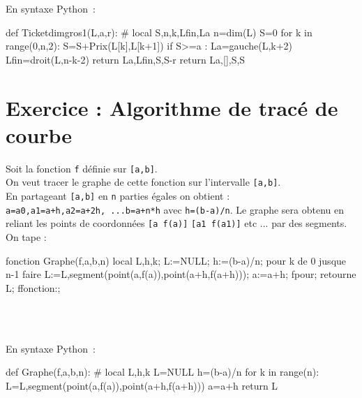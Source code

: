 \documentclass[12pt,a4paper]{book}
\begin{document}
\begin{giacjshere}
En syntaxe Python~:
\begin{giacprog}
def Ticketdimgros1(L,a,r):
    # local S,n,k,Lfin,La
    n=dim(L)
    S=0
    for k in range(0,n,2):
        S=S+Prix(L[k],L[k+1])
        if S>=a :
            La=gauche(L,k+2)
            Lfin=droit(L,n-k-2)
            return La,Lfin,S,S-r
    return La,[],S,S
\end{giacprog}

\section{Exercice : Algorithme de trac\'e de courbe}
Soit la fonction {\tt f} d\'efinie sur {\tt [a,b]}.\\
 On veut tracer le graphe de cette fonction sur l'intervalle {\tt [a,b]}.\\
 En partageant {\tt [a,b]} en {\tt n} parties \'egales on obtient : \\
{\tt a=a0,a1=a+h,a2=a+2h, ...b=a+n*h} avec {\tt h=(b-a)/n}.
Le graphe sera obtenu en reliant les points de coordonn\'ees {\tt [a f(a)]}
{\tt [a1 f(a1)]} etc ... par des segments.\\
On tape :
\begin{giaconload}
fonction Graphe(f,a,b,n)
 local L,h,k;
 L:=NULL;
 h:=(b-a)/n;
 pour k de 0 jusque n-1 faire
   L:=L,segment(point(a,f(a)),point(a+h,f(a+h)));
   a:=a+h;
 fpour;
 retourne L;
ffonction:;
\end{giaconload}
\\
\\

En syntaxe Python~:
\begin{giacprog}
def Graphe(f,a,b,n):
    # local L,h,k
    L=NULL
    h=(b-a)/n
    for k in range(n):
        L=L,segment(point(a,f(a)),point(a+h,f(a+h)))
        a=a+h
    return L
\end{giacprog}


\end{giacjshere}
\end{document}
